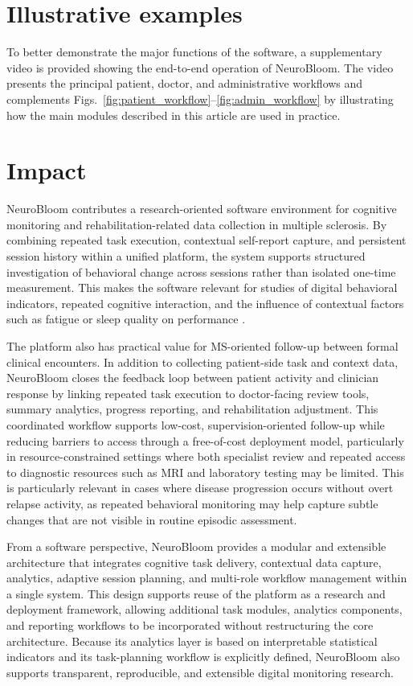 \documentclass[preprint,12pt,a4paper]{elsarticle}
\begin{document}
\section{Illustrative examples}
To better demonstrate the major functions of the software, a supplementary video is provided showing the end-to-end operation of NeuroBloom. The video presents the principal patient, doctor, and administrative workflows and complements Figs.~\ref{fig:patient_workflow}--\ref{fig:admin_workflow} by illustrating how the main modules described in this article are used in practice.

\section{Impact}
NeuroBloom contributes a research-oriented software environment for cognitive monitoring and rehabilitation-related data collection in multiple sclerosis. By combining repeated task execution, contextual self-report capture, and persistent session history within a unified platform, the system supports structured investigation of behavioral change across sessions rather than isolated one-time measurement. This makes the software relevant for studies of digital behavioral indicators, repeated cognitive interaction, and the influence of contextual factors such as fatigue or sleep quality on performance \cite{insel2017,coravos2019}.

The platform also has practical value for MS-oriented follow-up between formal clinical encounters. In addition to collecting patient-side task and context data, NeuroBloom closes the feedback loop between patient activity and clinician response by linking repeated task execution to doctor-facing review tools, summary analytics, progress reporting, and rehabilitation adjustment. This coordinated workflow supports low-cost, supervision-oriented follow-up while reducing barriers to access through a free-of-cost deployment model, particularly in resource-constrained settings where both specialist review and repeated access to diagnostic resources such as MRI and laboratory testing may be limited. This is particularly relevant in cases where disease progression occurs without overt relapse activity, as repeated behavioral monitoring may help capture subtle changes that are not visible in routine episodic assessment.

From a software perspective, NeuroBloom provides a modular and extensible architecture that integrates cognitive task delivery, contextual data capture, analytics, adaptive session planning, and multi-role workflow management within a single system. This design supports reuse of the platform as a research and deployment framework, allowing additional task modules, analytics components, and reporting workflows to be incorporated without restructuring the core architecture. Because its analytics layer is based on interpretable statistical indicators and its task-planning workflow is explicitly defined, NeuroBloom also supports transparent, reproducible, and extensible digital monitoring research.
\end{document}
